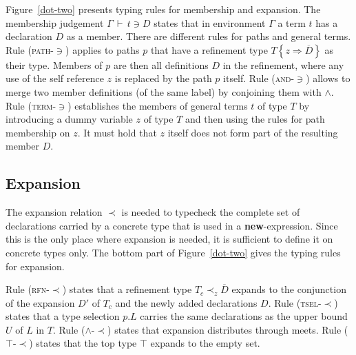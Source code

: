 \documentclass{llncs}
\renewcommand{\ts}{\,\vdash\,}
\newcommand{\expand}{\prec}
\newcommand{\tand}{\wedge}
\newcommand{\refine}[2]{\left\{#1 \Rightarrow #2 \right\}}
\newcommand{\seq}[1]{\overline{#1}}
\begin{document}
Figure~\ref{dot-two} presents typing rules for membership and
expansion.  The membership judgement $\Gamma \ts t \ni D$ states that
in environment $\Gamma$ a term $t$ has a declaration $D$ as a member.
There are different rules for paths and general terms.  Rule
(\textsc{path-$\ni$}) applies to paths $p$ that have a refinement type
$T \refine z {\seq D}$ as their type. Members of $p$ are then all
definitions $D$ in the refinement, where any use of the self reference
$z$ is replaced by the path $p$ itself.  Rule (\textsc{and-$\ni$})
allows to merge two member definitions (of the same label) by
conjoining them with $\tand$. Rule (\textsc{term-$\ni$}) establishes
the members of general terms $t$ of type $T$ by introducing a dummy
variable $z$ of type $T$ and then using the rules for path membership
on $z$. It must hold that $z$ itself does not form part of the
resulting member $D$.

\subsection*{Expansion}
      
The expansion relation $\expand$ is needed to typecheck the complete
set of declarations carried by a concrete type that is used in a
\textbf{new}-expression.  Since this is the only place where expansion
is needed, it is sufficient to define it on concrete types only. The
bottom part of Figure~\ref{dot-two} gives the typing rules for
expansion.

Rule (\textsc{rfn-$\expand$}) states that a refinement type $T_c
\expand_z {\seq D}$ expands to the conjunction of the expansion $D'$
of $T_c$ and the newly added declarations $D$. Rule
(\textsc{tsel-$\expand$}) states that a type selection $p.L$ carries
the same declarations as the upper bound $U$ of $L$ in $T$.  Rule
($\tand$-$\expand$) states that expansion distributes through meets.
Rule (\textsc{$\top$-$\expand$}) states that the top type $\top$
expands to the empty set.
\end{document}
